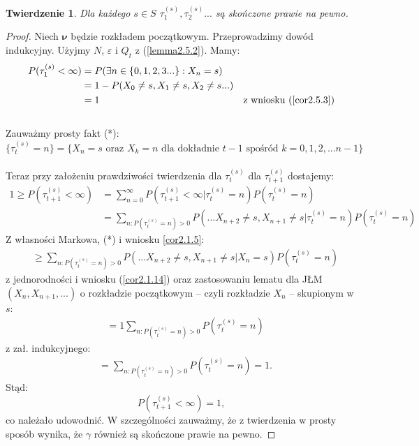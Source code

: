 \documentclass[a4paper]{article}
\theoremstyle{defn}
\theoremstyle{theorem}
\newtheorem{theorem}[defn]{Twierdzenie}
\theoremstyle{lemma}
\theoremstyle{cor}
\theoremstyle{fact}
\begin{document}
\begin{theorem}\label{theorem2.5.4}
Dla każdego $s\in S$ $\tau_1^{(s)}, \tau_2^{(s)}...$ są skończone prawie na pewno.
\end{theorem}
\begin{proof}
Niech $\boldsymbol{\nu}$ będzie rozkładem początkowym. Przeprowadzimy dowód indukcyjny. Użyjmy $N$, $\varepsilon$ i $Q_t$ z (\ref{lemma2.5.2}). Mamy:
\begin{align*}
P(\tau_1^{(s)}< \infty) &= P(\exists n \in \{0,1,2,3...\}: X_n = s) \\
&= 1 - P(X_0 \neq s, X_{1} \neq s, X_2 \neq s ...) \\
&= 1 & \text{z wniosku (\ref{cor2.5.3})}
\end{align*}
\\
Zauważmy prosty fakt (*):
$$\{\tau_t^{(s)} = n\} = \{X_n = s \,\,\text{oraz}\,\, X_k = n \,\, \text{dla dokładnie}\,\, t-1\,\, \text{spośród}\,\, k = 0,1,2,...n-1\}$$
\\
Teraz przy założeniu prawdziwości twierdzenia dla $\tau_{t}^{(s)}$ dla $\tau_{t+1}^{(s)}$ dostajemy: \\
\begin{align*}
1 \geq P(\tau_{t+1}^{(s)} < \infty) &= \sum_{n = 0}^{\infty} P(\tau_{t+1}^{(s)} < \infty| \tau_{t}^{(s)} = n)P(\tau_{t}^{(s)} = n)\\
&= \sum_{n: P(\tau_{t}^{(s)} = n) > 0} P(... X_{n+2} \neq s, X_{n+1} \neq s| \tau_{t}^{(s)} = n) P(\tau_{t}^{(s)} = n)
\end{align*}
Z własności Markowa, (*) i wniosku \ref{cor2.1.5}:
\begin{align*}
&\geq \sum_{n: P(\tau_{t}^{(s)} = n) > 0} P(... X_{n+2} \neq s, X_{n+1} \neq s |X_n = s) P(\tau_{t}^{(s)} = n)
\end{align*}
z jednorodności i wniosku (\ref{cor2.1.14}) oraz zastosowaniu lematu dla JŁM $(X_n, X_{n+1}, ...)$ o rozkładzie początkowym – czyli rozkładzie $X_n$ – skupionym w $s$:
\begin{align*}
&= 1\sum_{n: P(\tau_{t}^{(s)} = n) > 0} P(\tau_{t}^{(s)} = n)
\end{align*}
z zał. indukcyjnego:
\begin{align*}
&= \sum_{n: P(\tau_{t}^{(s)} = n) > 0} P(\tau_{t}^{(s)} = n) = 1.
\end{align*}
Stąd:
$$P(\tau_{t+1}^{(s)} < \infty) = 1,$$
co należało udowodnić. W szczególności zauważmy, że z twierdzenia w prosty sposób wynika, że $\gamma$ również są skończone prawie na pewno.
\end{proof}
\end{document}
